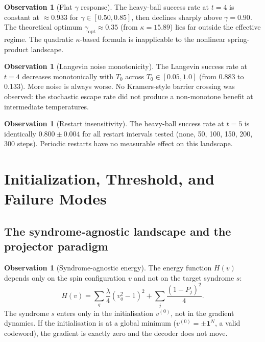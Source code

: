 \documentclass[12pt,a4paper]{article}
\theoremstyle{plain}
\theoremstyle{definition}
\newtheorem{observation}[theorem]{Observation}
\theoremstyle{remark}
\begin{document}
\begin{observation}[Flat $\gamma$ response]\label{obs:gamma_flat}
The heavy-ball success rate at $t=4$ is constant at $\approx 0.933$ for
$\gamma \in [0.50, 0.85]$, then declines sharply above $\gamma = 0.90$.
The theoretical optimum $\gamma_{\mathrm{opt}} \approx 0.35$
(from $\kappa = 15.89$) lies far outside the effective regime.
The quadratic $\kappa$-based formula is inapplicable to the nonlinear
spring-product landscape.
\end{observation}

\begin{observation}[Langevin noise monotonicity]\label{obs:langevin_mono}
The Langevin success rate at $t=4$ decreases monotonically with $T_0$
across $T_0 \in [0.05, 1.0]$ (from 0.883 to 0.133).
More noise is always worse.
No Kramers-style barrier crossing was observed: the stochastic escape rate
did not produce a non-monotone benefit at intermediate temperatures.
\end{observation}

\begin{observation}[Restart insensitivity]\label{obs:restart}
The heavy-ball success rate at $t=5$ is identically $0.800 \pm 0.004$
for all restart intervals tested (none, 50, 100, 150, 200, 300 steps).
Periodic restarts have no measurable effect on this landscape.
\end{observation}

\section{Initialization, Threshold, and Failure Modes}\label{sec:threshold}

\subsection{The syndrome-agnostic landscape and the projector paradigm}

\begin{observation}[Syndrome-agnostic energy]\label{obs:agnostic}
The energy function $H(v)$ depends only on the spin configuration $v$
and not on the target syndrome $s$:
\[
  H(v) = \sum_q \frac{\lambda}{4}(v_q^2-1)^2 + \sum_j \frac{(1-P_j)^2}{4}.
\]
The syndrome $s$ enters only in the initialisation $v^{(0)}$, not in the
gradient dynamics.
If the initialisation is at a global minimum ($v^{(0)} = \pm\bm{1}^N$,
a valid codeword), the gradient is exactly zero and the decoder does not
move.
\end{observation}
\end{document}
